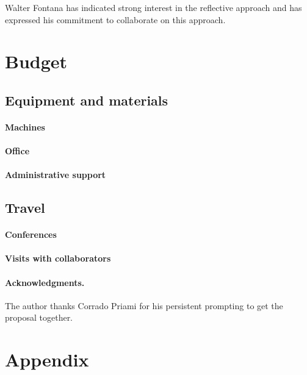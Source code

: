 \documentclass[]{amsart}
\theoremstyle{definition}
\theoremstyle{remark}
\numberwithin{equation}{subsection}
\begin{document}
Walter Fontana has indicated strong interest in the reflective
approach and has expressed his commitment to collaborate on this
approach.

\section{Budget}

\subsection{Equipment and materials}
	
	\paragraph{Machines}
	\paragraph{Office}
	\paragraph{Administrative support}

\subsection{Travel}

	\paragraph{Conferences}
	\paragraph{Visits with collaborators}

\paragraph{Acknowledgments.}
The author thanks Corrado Priami for his persistent prompting to get
the proposal together.





\section{Appendix}
\end{document}
